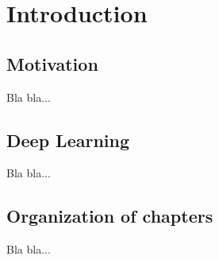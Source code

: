 

\chapter{Introduction}\label{chapter:introduction}

\section{Motivation}

Bla bla...

\section{Deep Learning}

Bla bla...

\section{Organization of chapters}

Bla bla...


